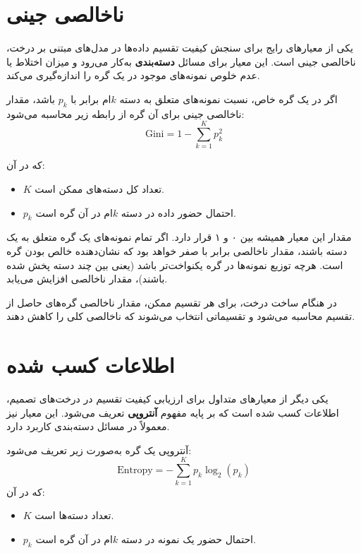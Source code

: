 \section[ناخالصی جینی]{ناخالصی جینی}

یکی از معیارهای رایج برای سنجش کیفیت تقسیم داده‌ها در مدل‌های مبتنی بر درخت، ناخالصی جینی است. این معیار برای مسائل \textbf{دسته‌بندی} به‌کار می‌رود و میزان اختلاط یا عدم خلوص نمونه‌های موجود در یک گره را اندازه‌گیری می‌کند.

اگر در یک گره خاص، نسبت نمونه‌های متعلق به دسته $k$ام برابر با $p_k$ باشد، مقدار ناخالصی جینی برای آن گره از رابطه زیر محاسبه می‌شود:
\[
\text{Gini} = 1 - \sum_{k=1}^{K} p_k^2
\]

که در آن:

\begin{itemize}
	\item $K$ تعداد کل دسته‌های ممکن است.
	\item $p_k$ احتمال حضور داده در دسته $k$ام در آن گره است.
\end{itemize}

مقدار این معیار همیشه بین ۰ و ۱ قرار دارد. اگر تمام نمونه‌های یک گره متعلق به یک دسته باشند، مقدار ناخالصی برابر با صفر خواهد بود که نشان‌دهنده خالص بودن گره است. هرچه توزیع نمونه‌ها در گره یکنواخت‌تر باشد (یعنی بین چند دسته پخش شده باشند)، مقدار ناخالصی افزایش می‌یابد.

در هنگام ساخت درخت، برای هر تقسیم ممکن، مقدار ناخالصی گره‌های حاصل از تقسیم محاسبه می‌شود و تقسیماتی انتخاب می‌شوند که ناخالصی کلی را کاهش دهند.

\section[اطلاعات کسب شده]{اطلاعات کسب شده}

یکی دیگر از معیارهای متداول برای ارزیابی کیفیت تقسیم در درخت‌های تصمیم، اطلاعات کسب شده است که بر پایه مفهوم \textbf{آنتروپی} تعریف می‌شود. این معیار نیز معمولاً در مسائل دسته‌بندی کاربرد دارد.

آنتروپی یک گره به‌صورت زیر تعریف می‌شود:
\[
\text{Entropy} = - \sum_{k=1}^{K} p_k \log_2(p_k)
\]
که در آن:

\begin{itemize}
	\item $K$ تعداد دسته‌ها است.
	\item $p_k$ احتمال حضور یک نمونه در دسته $k$ام در آن گره است.
\end{itemize}

